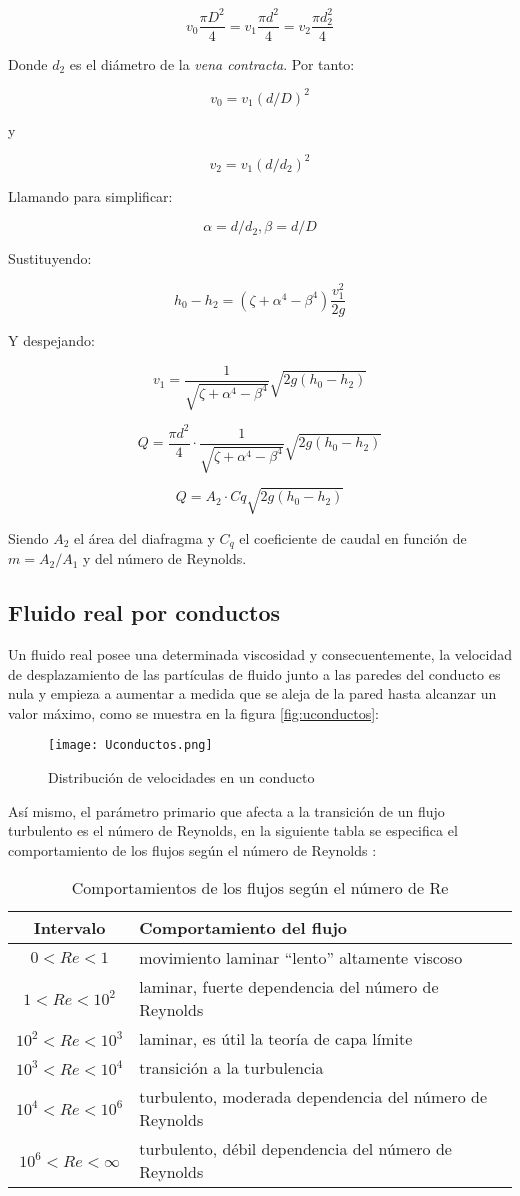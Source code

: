 \[v_{0} \frac{\pi D^2}{4}=v_{1} \frac{\pi d^2}{4}=v_{2} \frac{\pi d_{2}^2}{4}\]

Donde \(d_2\) es el diámetro de la \emph{vena contracta}. Por tanto:

\[v_{0}=v_{1}(d/D)^2\]

y

\[v_{2}=v_{1}(d/d_{2})^2\]

Llamando para simplificar:

\[\alpha = d/d_{2}, \beta =d/D\]

Sustituyendo:

\[h_{0}-h_{2}=(\zeta+\alpha^4-\beta^4)\frac{v_{1}^2}{2g}\]

Y despejando:

\[v_1=\frac{1}{\sqrt{\zeta + \alpha ^4-\beta ^4}}\sqrt{2g(h_{0}-h_{2})}\]

\[Q=\frac{\pi d^2}{4}\cdot \frac{1}{\sqrt{\zeta +\alpha ^4-\beta ^4}}\sqrt{2g(h_{0}-h_{2})}\]

\[Q= A_2 \cdot  Cq \sqrt{2g(h_0 -h_2)}\]

Siendo \(A_2\) el área del diafragma y \(C_q\) el coeficiente de caudal
en función de \(m=A_2 /A_1\) y del número de Reynolds.

\subsection{Fluido real por conductos}\label{header-n94}

Un fluido real posee una determinada viscosidad y consecuentemente, la
velocidad de desplazamiento de las partículas de fluido junto a las
paredes del conducto es nula y empieza a aumentar a medida que se aleja
de la pared hasta alcanzar un valor máximo, como se muestra en la
figura \autoref{fig:uconductos}:

\begin{figure}[b]
\centering
\texttt{[image: Uconductos.png]}
\caption[Distribución de velocidades]{Distribución de velocidades en un conducto \cite{Luszczewski99}}
\label{fig:uconductos}
\end{figure}

Así mismo, el parámetro primario que afecta a la transición de un flujo
turbulento es el número de Reynolds, en la siguiente tabla se especifica el comportamiento de los flujos según el número de
Reynolds \cite{Mataix82}:

\begin{longtable}[]{@{}cl@{}}
\caption[Comportamiento del flujo según Re]{Comportamientos de los flujos según el número de Re}
\hline
Intervalo & Comportamiento del flujo\tabularnewline
\hline
\endhead
$0 < Re < 1$ & movimiento laminar ``lento'' altamente viscoso\tabularnewline
$1 < Re < 10^2$ & laminar, fuerte dependencia del número de Reynolds\tabularnewline
$10^2 < Re < 10^3$ & laminar, es útil la teoría de capa límite\tabularnewline
$10^3 < Re < 10^4$ & transición a la turbulencia\tabularnewline
$10^4 < Re < 10^6$ & turbulento, moderada dependencia del número de Reynolds\tabularnewline
$10^6 < Re < \infty$ & turbulento, débil dependencia del número de Reynolds\tabularnewline
\hline
\end{longtable}


